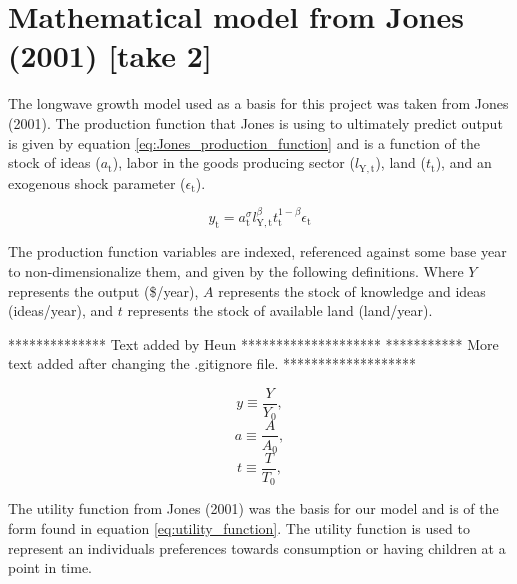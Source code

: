 \documentclass[letterpaper,12pt]{article}
\begin{document}

\section{Mathematical model from Jones (2001) [take 2]}
The longwave growth model used as a basis for this project was taken from Jones (2001). The production function that Jones is using to ultimately predict output is given by equation \ref{eq:Jones_production_function} and is a function of the stock of ideas ($a_\mathrm{t}$), labor in the goods producing sector ($l_\mathrm{Y,t}$), land ($t_\mathrm{t}$), and an exogenous shock parameter ($\epsilon_\mathrm{t}$).

\begin{equation} \label{eq:Jones_production_function}
y_\mathrm{t} = a_\mathrm{t} ^\sigma l_\mathrm{Y,t} ^\beta t_\mathrm{t} ^{1-\beta} \epsilon_\mathrm{t}
\end{equation}

The production function variables are indexed, referenced against some base year to non-dimensionalize them, and given by the following definitions. Where $Y$ represents the output (\$/year), $A$ represents the stock of knowledge and ideas (ideas/year), and $t$ represents the stock of available land (land/year).

************** Text added by Heun ********************
*********** More text added after changing the .gitignore file. *******************

\begin{equation} \label{eq:index_y}
y \equiv \frac{Y}{Y_\mathrm{0}},
\end{equation}
\begin{equation} \label{eq:index_a}
a \equiv \frac{A}{A_\mathrm{0}},
\end{equation}
\begin{equation} \label{eq:index_t}
t \equiv \frac{T}{T_\mathrm{0}},
\end{equation}


The utility function from Jones (2001) was the basis for our model and is of the form found in equation \ref{eq:utility_function}. The utility function is used to represent an individuals preferences towards consumption or having children at a point in time. 
\end{document}
